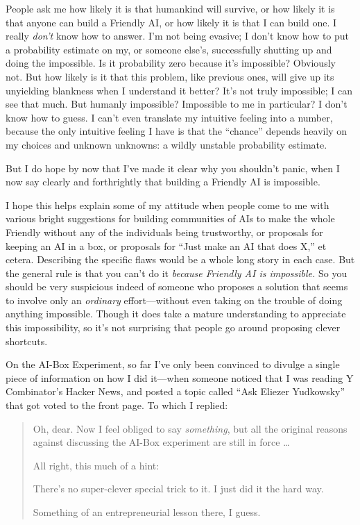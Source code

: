 {
 People ask me how likely it is that humankind will survive, or how
likely it is that anyone can build a Friendly AI, or how likely it is
that I can build one. I really \textit{don't} know how
to answer. I'm not being evasive; I
don't know how to put a probability estimate on my, or
someone else's, successfully shutting up and doing the
impossible. Is it probability zero because it's
impossible? Obviously not. But how likely is it that this problem, like
previous ones, will give up its unyielding blankness when I understand
it better? It's not truly impossible; I can see that
much. But humanly impossible? Impossible to me in particular? I
don't know how to guess. I can't even
translate my intuitive feeling into a number, because the only
intuitive feeling I have is that the
``chance'' depends heavily on my
choices and unknown unknowns: a wildly unstable probability estimate.}

{
 But I do hope by now that I've made it clear why
you shouldn't panic, when I now say clearly and
forthrightly that building a Friendly AI is impossible.}

{
 I hope this helps explain some of my attitude when people come to
me with various bright suggestions for building communities of AIs to
make the whole Friendly without any of the individuals being
trustworthy, or proposals for keeping an AI in a box, or proposals for
``Just make an AI that does X,'' et
cetera. Describing the specific flaws would be a whole long story in
each case. But the general rule is that you can't do it
\textit{because Friendly AI is impossible.} So you should be very
suspicious indeed of someone who proposes a solution that seems to
involve only an \textit{ordinary} effort---without even taking on the
trouble of doing anything impossible. Though it does take a mature
understanding to appreciate this impossibility, so it's
not surprising that people go around proposing clever shortcuts.}

{
 On the AI-Box Experiment, so far I've only been
convinced to divulge a single piece of information on how I did
it---when someone noticed that I was reading Y
Combinator's Hacker News, and posted a topic called
``Ask Eliezer Yudkowsky'' that got
voted to the front page. To which I replied:}

\begin{quote}
{
 Oh, dear. Now I feel obliged to say \textit{something}, but all
the original reasons against discussing the AI-Box experiment are still
in force \ldots}

{
 All right, this much of a hint:}

{
 There's no super-clever special trick to it. I
just did it the hard way.}

{
  Something of an entrepreneurial lesson there, I guess.}
\end{quote}

